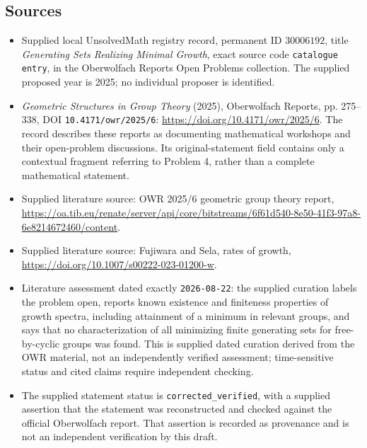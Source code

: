 \documentclass[11pt]{article}
\begin{document}
\subsection{Sources}
\begin{itemize}
\item Supplied local UnsolvedMath registry record, permanent ID \(30006192\), title \emph{Generating Sets Realizing Minimal Growth}, exact source code \texttt{catalogue entry}, in the Oberwolfach Reports Open Problems collection. The supplied proposed year is 2025; no individual proposer is identified.
\item \emph{Geometric Structures in Group Theory} (2025), Oberwolfach Reports, pp. 275--338, DOI \texttt{10.4171/owr/2025/6}: \url{https://doi.org/10.4171/owr/2025/6}. The record describes these reports as documenting mathematical workshops and their open-problem discussions. Its original-statement field contains only a contextual fragment referring to Problem 4, rather than a complete mathematical statement.
\item Supplied literature source: OWR 2025/6 geometric group theory report, \url{https://oa.tib.eu/renate/server/api/core/bitstreams/6f61d540-8e50-41f3-97a8-6e8214672460/content}.
\item Supplied literature source: Fujiwara and Sela, rates of growth, \url{https://doi.org/10.1007/s00222-023-01200-w}.
\item Literature assessment dated exactly \texttt{2026-08-22}: the supplied curation labels the problem open, reports known existence and finiteness properties of growth spectra, including attainment of a minimum in relevant groups, and says that no characterization of all minimizing finite generating sets for free-by-cyclic groups was found. This is supplied dated curation derived from the OWR material, not an independently verified assessment; time-sensitive status and cited claims require independent checking.
\item The supplied statement status is \texttt{corrected\_verified}, with a supplied assertion that the statement was reconstructed and checked against the official Oberwolfach report. That assertion is recorded as provenance and is not an independent verification by this draft.
\end{itemize}
\end{document}
